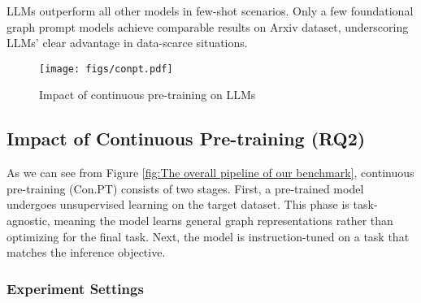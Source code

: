 \begin{remark}
LLMs outperform all other models in few-shot scenarios. Only a few foundational graph prompt models achieve comparable results on Arxiv dataset, underscoring LLMs’ clear advantage in data-scarce situations.
\end{remark}



\begin{figure}[htbp]
  \centering
  \texttt{[image: figs/conpt.pdf]}
  \caption{Impact of continuous pre-training on LLMs}
  \label{fig:Continuous Pre-Trainings}
\end{figure}

\subsection{Impact of Continuous Pre-training (RQ2)}
\label{sec:Case 3}
As we can see from Figure \ref{fig:The overall pipeline of our benchmark}, continuous pre-training (Con.PT) consists of two stages. First, a pre-trained model undergoes unsupervised learning on the target dataset. This phase is task-agnostic, meaning the model learns general graph representations rather than optimizing for the final task. Next, the model is instruction-tuned on a task that matches the inference objective.
\subsubsection{Experiment Settings}


